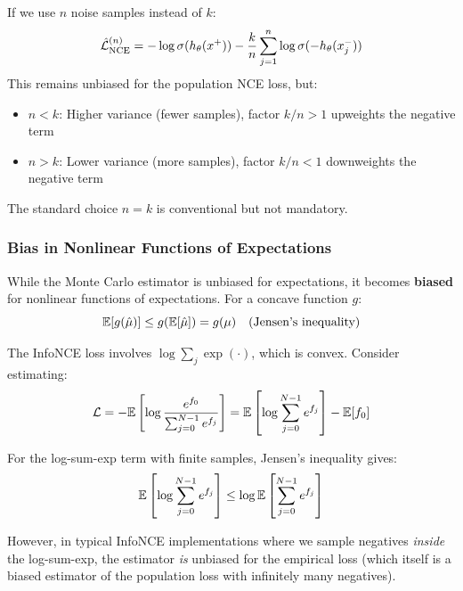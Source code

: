 \begin{notechapter}
\begin{remark}
If we use $n$ noise samples instead of $k$:
\begin{equation}
\hat{\mathcal{L}}_{\text{NCE}}^{(n)} = -\log \sigma(h_\theta(x^+)) - \frac{k}{n}\sum_{j=1}^{n} \log \sigma(-h_\theta(x_j^-))
\end{equation}
This remains unbiased for the population NCE loss, but:
\begin{itemize}
    \item $n < k$: Higher variance (fewer samples), factor $k/n > 1$ upweights the negative term
    \item $n > k$: Lower variance (more samples), factor $k/n < 1$ downweights the negative term
\end{itemize}
The standard choice $n = k$ is conventional but not mandatory.
\end{remark}

\subsubsection{Bias in Nonlinear Functions of Expectations}

\begin{proposition}
\label{contrastive-rigorous:prop:jensen_bias}
While the Monte Carlo estimator is unbiased for expectations, it becomes \textbf{biased} for nonlinear functions of expectations. For a concave function $g$:
\begin{equation}
\mathbb{E}[g(\hat{\mu})] \leq g(\mathbb{E}[\hat{\mu}]) = g(\mu) \quad \text{(Jensen's inequality)}
\end{equation}
\end{proposition}

\begin{example}
The InfoNCE loss involves $\log \sum_j \exp(\cdot)$, which is convex. Consider estimating:
\begin{equation}
\mathcal{L} = -\mathbb{E}\left[\log \frac{e^{f_0}}{\sum_{j=0}^{N-1} e^{f_j}}\right] = \mathbb{E}\left[\log \sum_{j=0}^{N-1} e^{f_j}\right] - \mathbb{E}[f_0]
\end{equation}

For the log-sum-exp term with finite samples, Jensen's inequality gives:
\begin{equation}
\mathbb{E}\left[\log \sum_{j=0}^{N-1} e^{f_j}\right] \leq \log \mathbb{E}\left[\sum_{j=0}^{N-1} e^{f_j}\right]
\end{equation}

However, in typical InfoNCE implementations where we sample negatives \emph{inside} the log-sum-exp, the estimator \emph{is} unbiased for the empirical loss (which itself is a biased estimator of the population loss with infinitely many negatives).
\end{example}


\end{notechapter}
